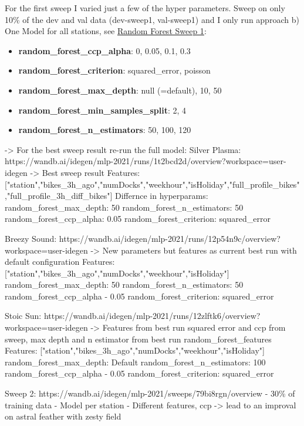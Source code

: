\documentclass[a4paper]{article}
\begin{document}
    For the first sweep I varied just a few of the hyper parameters. Sweep on only 10\% of the dev and val data
    (dev-sweep1, val-sweep1) and I only run approach b) One Model for all stations, see
    \href{https://wandb.ai/idegen/mlp-2021/sweeps/ylvvcigm/overview?workspace=user-idegen}{Random Forest Sweep 1}:

    \begin{itemize}
        \item \textbf{random\_forest\_ccp\_alpha}: 0, 0.05, 0.1, 0.3
        \item \textbf{random\_forest\_criterion}: squared\_error, poisson
        \item \textbf{random\_forest\_max\_depth}: null (=default), 10, 50
        \item \textbf{random\_forest\_min\_samples\_split}: 2, 4
        \item \textbf{random\_forest\_n\_estimators}: 50, 100, 120
    \end{itemize}

    -> For the best sweep result re-run the full model:
    Silver Plasma: https://wandb.ai/idegen/mlp-2021/runs/1t2bcd2d/overview?workspace=user-idegen
    -> Best sweep result
    Features:
    ["station","bikes\_3h\_ago","numDocks","weekhour","isHoliday","full\_profile\_bikes","full\_profile\_3h\_diff\_bikes"]
    Differnce in hyperparams:
    random\_forest\_max\_depth: 50
    random\_forest\_n\_estimators: 50
    random\_forest\_ccp\_alpha: 0.05
    random\_forest\_criterion: squared\_error

    Breezy Sound: https://wandb.ai/idegen/mlp-2021/runs/12p54n9c/overview?workspace=user-idegen
    -> New parameters but features as current best run with default configuration
    Features: ["station","bikes\_3h\_ago","numDocks","weekhour","isHoliday"]
    random\_forest\_max\_depth: 50
    random\_forest\_n\_estimators: 50
    random\_forest\_ccp\_alpha - 0.05
    random\_forest\_criterion: squared\_error

    Stoic Sun: https://wandb.ai/idegen/mlp-2021/runs/12zlftk6/overview?workspace=user-idegen
    -> Features from best run squared error and ccp from sweep, max depth and n estimator from best run
    random\_forest\_features
    Features: ["station","bikes\_3h\_ago","numDocks","weekhour","isHoliday"]
    random\_forest\_max\_depth: Default
    random\_forest\_n\_estimators: 100
    random\_forest\_ccp\_alpha - 0.05
    random\_forest\_criterion: squared\_error

    Sweep 2: https://wandb.ai/idegen/mlp-2021/sweeps/79bi8rgn/overview
    - 30\% of training data
    - Model per station
    - Different features, ccp
    -> lead to an improval on astral feather with zesty field
\end{document}
